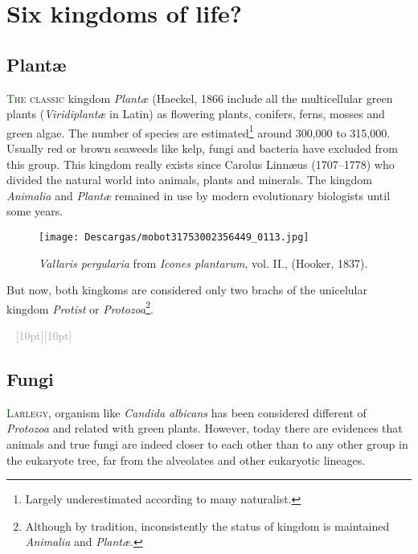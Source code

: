 \documentclass[twoside,12pt,english]{book}
\newcommand*\initfamily{\usefont{U}{Acorn}{xl}{n}}
\newcommand{\ornamento}{\vspace{2em}\noindent \textcolor{darkgray}{\hrulefill~ \raisebox{-2.5pt}[10pt][10pt]{\leafright \decofourleft \decothreeleft  \aldineright \decotwo \floweroneleft \decoone   \floweroneright \decotwo \aldineleft\decothreeright \decofourright \leafleft} ~  \hrulefill \\ \vspace{2em}}}
\begin{document}

\chapter{Six kingdoms of life?}
\newpage

\section{Plant\ae}
\lettrine[lines=3]{\initfamily\textcolor{darkgreen}{T}}{he classic} kingdom \emph{Plant\ae} (Haeckel, 1866
include all the multicellular green plants (\emph{Viridiplant\ae} in Latin) as flowering
plants, conifers, ferns, mosses and green algae. The number of species
are estimated\footnote{Largely underestimated according to many naturalist.} around 300,000 to 315,000.
Usually red or brown seaweeds like kelp, fungi and bacteria have
excluded from this group.
This kingdom really exists since Carolus Linn\ae us (1707--1778) who
divided the natural world into animals, plants and minerals. The kingdom \emph{Animalia}  and \emph{Plant\ae} remained
in use by modern evolutionary biologists until some years.

\begin{wrapfigure}{r}{0.26\textwidth}
	\centering
	\texttt{[image: Descargas/mobot31753002356449\_0113.jpg]}
	\caption{\footnotesize \emph{Vallaris pergularia} from \emph{Icones plantarum}, vol. II., (Hooker, 1837).}
	\label{fig1}
\end{wrapfigure}
But now, both kingkoms are considered only two brachs of the unicelular kingdom \emph{Protist}
or \emph{Protozoa}\footnote{Although by tradition,  inconsistently the status of kingdom
	is maintained \emph{Animalia}  and \emph{Plant\ae}.}.
\lipsum[2]

\lipsum[3]

\ornamento

\section{Fungi}

\lettrine[lines=3]{\initfamily\textcolor{darkgreen}{L}}{arlegy}, organism like \emph{Candida albicans} has
been considered different of \emph{Protozoa} and related with green plants. However, today there
are evidences that animals and true fungi are indeed closer to each other than to any other group
in the eukaryote tree, far from the alveolates and other eukaryotic lineages.
\end{document}
